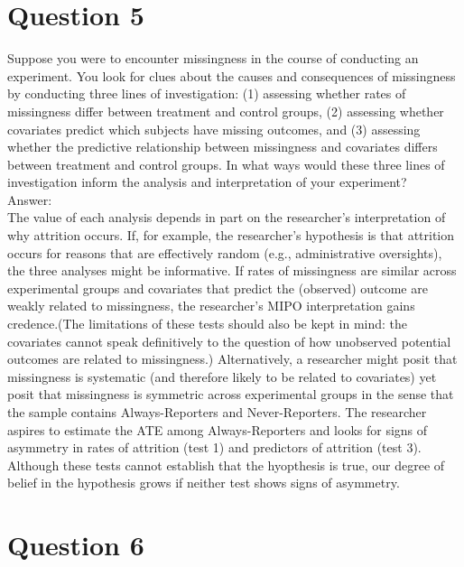 \documentclass[11pt,notitlepage]{article}\usepackage[]{graphicx}\usepackage[]{color}
\makeatletter
\newenvironment{kframe}{%
 \def\at@end@of@kframe{}%
 \ifinner\ifhmode%
  \def\at@end@of@kframe{\end{minipage}}%
  \begin{minipage}{\columnwidth}%
 \fi\fi%
 \def\FrameCommand##1{\hskip\@totalleftmargin \hskip-\fboxsep
 \colorbox{shadecolor}{##1}\hskip-\fboxsep
     \hskip-\linewidth \hskip-\@totalleftmargin \hskip\columnwidth}%
 \MakeFramed {\advance\hsize-\width
   \@totalleftmargin\z@ \linewidth\hsize
   \@setminipage}}%
 {\par\unskip\endMakeFramed%
 \at@end@of@kframe}
\newenvironment{knitrout}{}{} %
\makeatother
\begin{document}
\section*{Question 5}
Suppose you were to encounter missingness in the course of conducting an experiment. You look for clues about the causes and consequences of missingness by conducting three lines of investigation: (1) assessing whether rates of missingness differ between treatment and control groups, (2) assessing whether covariates predict which subjects have missing outcomes, and (3) assessing whether the predictive relationship between missingness and covariates differs between treatment and control groups. In what ways would these three lines of investigation inform the analysis and interpretation of your experiment?\\
Answer:\\
The value of each analysis depends in part on the researcher's interpretation of why attrition occurs. If, for example, the researcher's hypothesis is that attrition occurs for reasons that are effectively random (e.g., administrative oversights), the three analyses might be informative.  If rates of missingness are similar across experimental groups and covariates that predict the (observed) outcome are weakly related to missingness, the researcher's MIPO interpretation gains credence.(The limitations of these tests should also be kept in mind: the covariates cannot speak definitively to the question of how unobserved potential outcomes are related to missingness.)  Alternatively, a researcher might posit that missingness is systematic (and therefore likely to be related to covariates) yet posit that missingness is symmetric across experimental groups in the sense that the sample contains Always-Reporters and Never-Reporters. The researcher aspires to estimate the ATE among Always-Reporters and looks for signs of asymmetry in rates of attrition (test 1) and predictors of attrition (test 3). Although these tests cannot establish that the hyopthesis is true, our degree of belief in the hypothesis grows if neither test shows signs of asymmetry.
\section*{Question 6}
\begin{knitrout}
\color{fgcolor}\begin{kframe}
\begin{verbatim}






\end{verbatim}
\end{kframe}
\end{knitrout}
\end{document}

